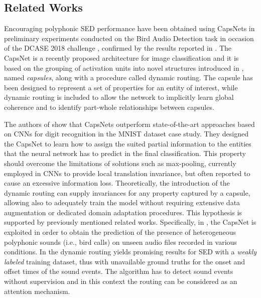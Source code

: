 \subsection{Related Works}

Encouraging polyphonic SED performance have been obtained using CapsNets in preliminary experiments conducted on the Bird Audio Detection task in occasion of the DCASE 2018 challenge \cite{vesperini2018capsule}, confirmed by the results reported in \cite{iqbal2018capsule}.
The CapsNet \cite{sabour2017dynamic} is a recently proposed architecture for image classification and it is based on the grouping of activation units into novel structures introduced in \cite{hinton2011transforming}, named \textit{capsules}, along with a procedure called dynamic routing. The capsule has been designed to represent a set of properties for an entity of interest, while dynamic routing is included to allow the network to implicitly learn global coherence and to identify part-whole relationships between capsules.


The authors of \cite{sabour2017dynamic} show that CapsNets outperform state-of-the-art approaches based on CNNs for digit recognition in the MNIST dataset case study.
They designed the CapsNet to learn how to assign the suited partial information to the entities that the neural network has to predict in the final classification. This property should overcome the limitations of solutions such as max-pooling, currently employed in CNNs to provide local translation invariance, but often reported to cause an excessive information loss. Theoretically, the introduction of the dynamic routing can supply invariances for any property captured by a capsule, allowing also to adequately train the model without requiring extensive data augmentation or dedicated domain adaptation procedures. This hypothesis is supported by previously mentioned related works. Specifically, in \cite{vesperini2018capsule}, the CapsNet is exploited in order to obtain the prediction of the presence of heterogeneous polyphonic sounds (i.e., bird calls) on unseen audio files recorded in various conditions. In \cite{iqbal2018capsule} the dynamic routing yields promising results for SED with a \textit{weakly labeled} training dataset, thus with unavailable ground truths for the onset and offset times of the sound events. The algorithm has to detect sound events without supervision and in this context the routing can be considered as an attention mechanism. 





